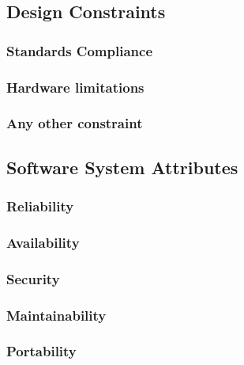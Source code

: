 \subsection{Design Constraints}
\subsubsection{Standards Compliance}
\subsubsection{Hardware limitations}
\subsubsection{Any other constraint}
\subsection{Software System Attributes}
\subsubsection{Reliability}
\subsubsection{Availability}
\subsubsection{Security}
\subsubsection{Maintainability}
\subsubsection{Portability}